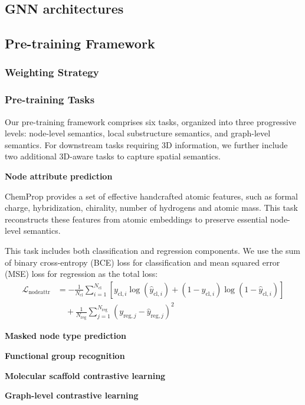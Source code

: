 \documentclass{article}
\theoremstyle{plain}
\theoremstyle{definition}
\theoremstyle{remark}
\begin{document}
\subsection{GNN architectures}

\subsection{Pre-training Framework}
\subsubsection{Weighting Strategy}

\subsubsection{Pre-training Tasks}
Our pre-training framework comprises six tasks, organized into three progressive levels: node-level semantics, local substructure semantics, and graph-level semantics. For downstream tasks requiring 3D information, we further include two additional 3D-aware tasks to capture spatial semantics.

\textbf{Node attribute prediction} 

ChemProp provides a set of effective handcrafted atomic features, such as formal charge, hybridization, chirality, number of hydrogens and atomic mass. This task reconstructs these features from atomic embeddings to preserve essential node-level semantics. 

This task includes both classification and regression components.  
We use the sum of binary cross-entropy (BCE) loss for classification and mean squared error (MSE) loss for regression as the total loss:
\begin{align*}
\mathcal{L}_{\text{nodeattr}} 
&= -\frac{1}{N_{\text{cl}}} \sum_{i=1}^{N_{\text{cl}}} \left[ y_{\text{cl},i} \log(\hat{y}_{\text{cl},i}) + (1 - y_{\text{cl},i}) \log(1 - \hat{y}_{\text{cl},i}) \right] \\
&\quad + \frac{1}{N_{\text{reg}}} \sum_{j=1}^{N_{\text{reg}}} \left( y_{\text{reg},j} - \hat{y}_{\text{reg},j} \right)^2
\end{align*}

\textbf{Masked node type prediction}

\textbf{Functional group recognition}

\textbf{Molecular scaffold contrastive learning}

\textbf{Graph-level contrastive learning}
\end{document}
